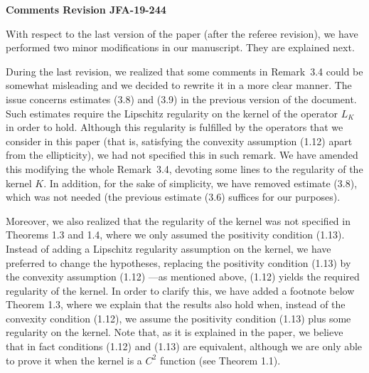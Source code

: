 \documentclass[]{report}
\title{}
\author{}
\begin{document}
	
	\begin{center}
		\textbf{	Comments Revision JFA-19-244}
	\end{center}

With respect to the last version of the paper (after the referee revision), we have performed two minor modifications in our manuscript. They are explained next.

During the last revision, we realized that some comments in Remark~3.4 could be somewhat misleading and we decided to rewrite it in a more clear manner. The issue concerns estimates (3.8) and (3.9) in the previous version of the document. Such estimates require the Lipschitz regularity on the kernel of the operator $L_K$ in order to hold. Although this regularity is fulfilled by the operators that we consider in this paper (that is, satisfying the convexity assumption (1.12) apart from the ellipticity), we had not specified this in such remark. We have amended this modifying the whole Remark~3.4, devoting some lines to the regularity of the kernel $K$. In addition, for the sake of simplicity, we have removed estimate (3.8), which was not needed (the previous estimate (3.6) suffices for our purposes).



Moreover, we also realized that the regularity of the kernel was not specified in Theorems 1.3 and 1.4, where we only assumed the positivity condition (1.13). Instead of adding a Lipschitz regularity assumption on the kernel, we have preferred to change the hypotheses, replacing the positivity condition (1.13) by the convexity assumption (1.12) ---as mentioned above, (1.12) yields the required regularity of the kernel. In order to clarify this, we have added a footnote below  Theorem 1.3, where we explain that the results also hold when, instead of the convexity condition (1.12), we assume the positivity condition (1.13) plus some regularity on the kernel. Note that, as it is explained in the paper, we believe that in fact conditions (1.12) and (1.13) are equivalent, although we are only able to prove it when the kernel is a $C^2$ function (see Theorem 1.1).  
\end{document}
